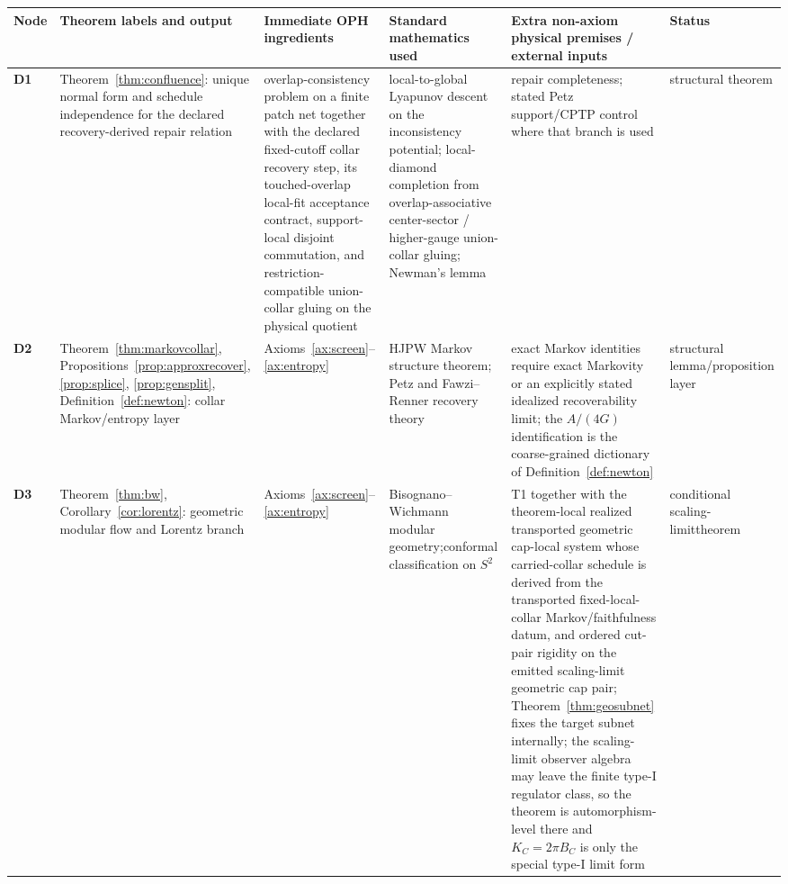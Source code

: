 \documentclass[11pt]{article}
\begin{document}
\begingroup
\scriptsize
\setlength{\tabcolsep}{1pt}
\begin{longtable}{@{}>{\raggedright\arraybackslash}p{}>{\raggedright\arraybackslash}p{}>{\raggedright\arraybackslash}p{}>{\raggedright\arraybackslash}p{}>{\raggedright\arraybackslash}p{}>{\raggedright\arraybackslash}p{}@{}}
\toprule
Node & Theorem labels and output & Immediate OPH ingredients & Standard mathematics used & Extra non-axiom physical premises / external inputs & Status \\
\midrule
\endhead
\bottomrule
\endfoot
\textbf{D1} & Theorem~\ref{thm:confluence}: unique normal form and schedule independence for the declared recovery-derived repair relation & overlap-consistency problem on a finite patch net together with the declared fixed-cutoff collar recovery step, its touched-overlap local-fit acceptance contract, support-local disjoint commutation, and restriction-compatible union-collar gluing on the physical quotient & local-to-global Lyapunov descent on the inconsistency potential; local-diamond completion from overlap-associative center-sector / higher-gauge union-collar gluing; Newman's lemma & repair completeness; stated Petz support/CPTP control where that branch is used & structural theorem \\
\textbf{D2} & Theorem~\ref{thm:markovcollar}, Propositions~\ref{prop:approxrecover}, \ref{prop:splice}, \ref{prop:gensplit}, Definition~\ref{def:newton}: collar Markov/entropy layer & Axioms~\ref{ax:screen}--\ref{ax:entropy} & HJPW Markov structure theorem; Petz and Fawzi--Renner recovery theory & exact Markov identities require exact Markovity or an explicitly stated idealized recoverability limit; the \(A/(4G)\) identification is the coarse-grained dictionary of Definition~\ref{def:newton} & structural lemma/\newline proposition layer \\
\textbf{D3} & Theorem~\ref{thm:bw}, Corollary~\ref{cor:lorentz}: geometric modular flow and Lorentz branch & Axioms~\ref{ax:screen}--\ref{ax:entropy} & Bisognano--Wichmann modular geometry;\newline conformal classification on \(S^2\) & T1 together with the theorem-local realized transported geometric cap-local system whose carried-collar schedule is derived from the transported fixed-local-collar Markov/faithfulness datum, and ordered cut-pair rigidity on the emitted scaling-limit geometric cap pair; Theorem~\ref{thm:geosubnet} fixes the target subnet internally; the scaling-limit observer algebra may leave the finite type-I regulator class, so the theorem is automorphism-level there and \(K_C=2\pi B_C\) is only the special type-I limit form & conditional scaling-limit\newline theorem \\

\end{longtable}
\end{document}
